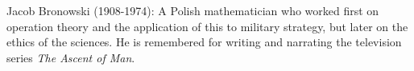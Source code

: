 Jacob Bronowski (1908-1974): A Polish mathematician who worked first on operation theory and the application of this to military strategy, but later on the ethics of the sciences. He is remembered for writing and narrating the television series \emph{The Ascent of Man}.
  
  